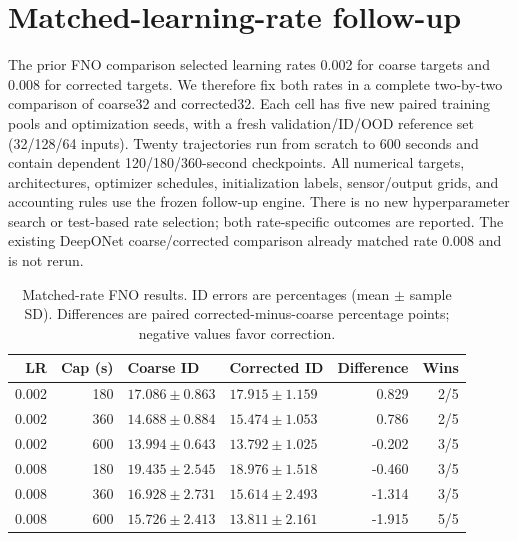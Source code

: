 \section{Matched-learning-rate follow-up}

The prior FNO comparison selected learning rates 0.002 for coarse targets and 0.008 for corrected targets. We therefore fix both rates in a complete two-by-two comparison of coarse32 and corrected32. Each cell has five new paired training pools and optimization seeds, with a fresh validation/ID/OOD reference set (32/128/64 inputs). Twenty trajectories run from scratch to 600 seconds and contain dependent 120/180/360-second checkpoints. All numerical targets, architectures, optimizer schedules, initialization labels, sensor/output grids, and accounting rules use the frozen follow-up engine. There is no new hyperparameter search or test-based rate selection; both rate-specific outcomes are reported. The existing DeepONet coarse/corrected comparison already matched rate 0.008 and is not rerun.

\begin{table}[ht]\centering\small

\caption{Matched-rate FNO results. ID errors are percentages (mean $\pm$ sample SD). Differences are paired corrected-minus-coarse percentage points; negative values favor correction.}

\begin{tabular}{rrllrr}\toprule LR & Cap (s) & Coarse ID & Corrected ID & Difference & Wins\\\midrule

0.002 & 180 & $17.086\pm0.863$ & $17.915\pm1.159$ & 0.829 & 2/5\\

0.002 & 360 & $14.688\pm0.884$ & $15.474\pm1.053$ & 0.786 & 2/5\\

0.002 & 600 & $13.994\pm0.643$ & $13.792\pm1.025$ & -0.202 & 3/5\\

0.008 & 180 & $19.435\pm2.545$ & $18.976\pm1.518$ & -0.460 & 3/5\\

0.008 & 360 & $16.928\pm2.731$ & $15.614\pm2.493$ & -1.314 & 3/5\\

0.008 & 600 & $15.726\pm2.413$ & $13.811\pm2.161$ & -1.915 & 5/5\\

\bottomrule\end{tabular}\end{table}

